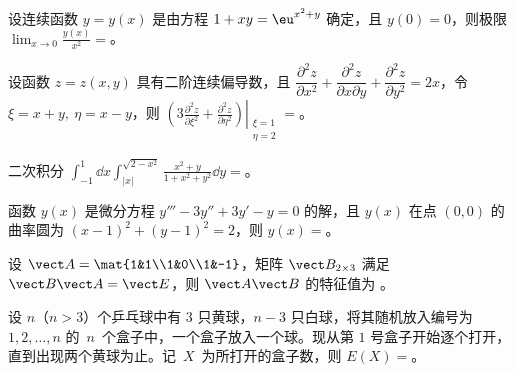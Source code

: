 \begin{question}[index=11]
设连续函数 $y=y(x)$ 是由方程 $1+xy=\eu^{x^2+y}$ 确定，且 $y(0)=0$，则极限 $\displaystyle\lim_{x\to0}\frac{y(x)}{x^2}=$\fillin。
\end{question}
\QuestionBreak

\begin{question}[index=12]
设函数 $z=z(x,y)$ 具有二阶连续偏导数，且 $\dfrac{\partial^2z}{\partial x^2}+\dfrac{\partial^2z}{\partial x\partial y}+\dfrac{\partial^2z}{\partial y^2}=2x$，令 $\xi=x+y,\ \eta=x-y$，则
$\displaystyle\left.\left(3\frac{\partial^2z}{\partial\xi^2}+\frac{\partial^2z}{\partial\eta^2}\right)\right|_{\substack{\xi=1\\\eta=2}}=$\fillin。
\end{question}
\QuestionBreak

\begin{question}[index=13]
二次积分 $\displaystyle\int_{-1}^1\dd x\int_{|x|}^{\sqrt{2-x^2}}\frac{x^2+y}{1+x^2+y^2}\dd y=$\fillin。
\end{question}
\QuestionBreak

\begin{question}[index=14]
函数 $y(x)$ 是微分方程 $y'''-3y''+3y'-y=0$ 的解，且 $y(x)$ 在点 $(0,0)$ 的曲率圆为 \allowbreak\mbox{$(x-1)^2+(y-1)^2=2$}，则 $y(x)=$\fillin。
\end{question}
\QuestionBreak

\begin{question}[index=15]
设 $\vect A=\mat{1&1\\1&0\\1&-1}$，矩阵 $\vect B_{2\times3}$ 满足 $\vect B\vect A=\vect E$，则 $\vect A\vect B$ 的特征值为 \fillin。
\end{question}
\QuestionBreak

\begin{question}[index=16]
设 $n$（$n>3$）个乒乓球中有 $3$ 只黄球，$n-3$ 只白球，将其随机放入编号为 $1,2,\dots,n$ \allowbreak\mbox{的 $n$ 个盒子中}，一个盒子放入一个球。现从第 $1$ 号盒子开始逐个打开，直到出现两个黄球为止。\allowbreak\mbox{记 $X$ 为}所打开的盒子数，则 $E(X)=$\fillin。
\end{question}
